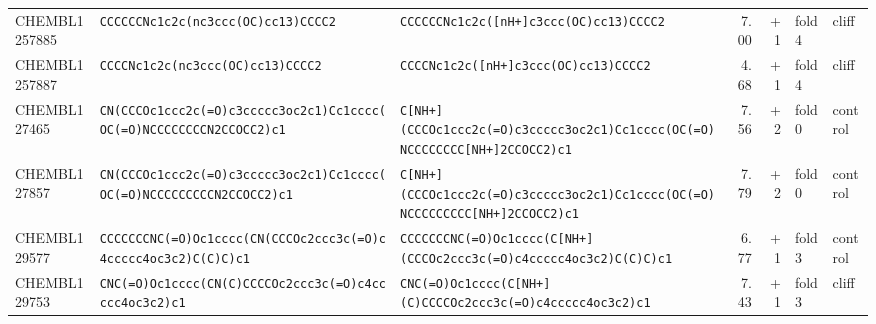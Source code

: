 \begin{longtable}{l p{4.4cm} p{4.4cm} r r l l}
CHEMBL1257885 & \texttt{CCCCCCNc1c2c(\allowbreak{}nc3ccc(\allowbreak{}OC)\allowbreak{}cc13)\allowbreak{}CCCC2} & \texttt{CCCCCCNc1c2c(\allowbreak{}[nH+]\allowbreak{}c3ccc(\allowbreak{}OC)\allowbreak{}cc13)\allowbreak{}CCCC2} & 7.00 & +1 & fold 4 & cliff \\
CHEMBL1257887 & \texttt{CCCCNc1c2c(\allowbreak{}nc3ccc(\allowbreak{}OC)\allowbreak{}cc13)\allowbreak{}CCCC2} & \texttt{CCCCNc1c2c(\allowbreak{}[nH+]\allowbreak{}c3ccc(\allowbreak{}OC)\allowbreak{}cc13)\allowbreak{}CCCC2} & 4.68 & +1 & fold 4 & cliff \\
CHEMBL127465 & \texttt{CN(\allowbreak{}CCCOc1ccc2c(\allowbreak{}=\allowbreak{}O)\allowbreak{}c3ccccc3oc2c1)\allowbreak{}Cc1cccc(\allowbreak{}OC(\allowbreak{}=\allowbreak{}O)\allowbreak{}NCCCCCCCCN2CCOCC2)\allowbreak{}c1} & \texttt{C[NH+]\allowbreak{}(\allowbreak{}CCCOc1ccc2c(\allowbreak{}=\allowbreak{}O)\allowbreak{}c3ccccc3oc2c1)\allowbreak{}Cc1cccc(\allowbreak{}OC(\allowbreak{}=\allowbreak{}O)\allowbreak{}NCCCCCCCC[NH+]\allowbreak{}2CCOCC2)\allowbreak{}c1} & 7.56 & +2 & fold 0 & control \\
CHEMBL127857 & \texttt{CN(\allowbreak{}CCCOc1ccc2c(\allowbreak{}=\allowbreak{}O)\allowbreak{}c3ccccc3oc2c1)\allowbreak{}Cc1cccc(\allowbreak{}OC(\allowbreak{}=\allowbreak{}O)\allowbreak{}NCCCCCCCCCN2CCOCC2)\allowbreak{}c1} & \texttt{C[NH+]\allowbreak{}(\allowbreak{}CCCOc1ccc2c(\allowbreak{}=\allowbreak{}O)\allowbreak{}c3ccccc3oc2c1)\allowbreak{}Cc1cccc(\allowbreak{}OC(\allowbreak{}=\allowbreak{}O)\allowbreak{}NCCCCCCCCC[NH+]\allowbreak{}2CCOCC2)\allowbreak{}c1} & 7.79 & +2 & fold 0 & control \\
CHEMBL129577 & \texttt{CCCCCCCNC(\allowbreak{}=\allowbreak{}O)\allowbreak{}Oc1cccc(\allowbreak{}CN(\allowbreak{}CCCOc2ccc3c(\allowbreak{}=\allowbreak{}O)\allowbreak{}c4ccccc4oc3c2)\allowbreak{}C(\allowbreak{}C)\allowbreak{}C)\allowbreak{}c1} & \texttt{CCCCCCCNC(\allowbreak{}=\allowbreak{}O)\allowbreak{}Oc1cccc(\allowbreak{}C[NH+]\allowbreak{}(\allowbreak{}CCCOc2ccc3c(\allowbreak{}=\allowbreak{}O)\allowbreak{}c4ccccc4oc3c2)\allowbreak{}C(\allowbreak{}C)\allowbreak{}C)\allowbreak{}c1} & 6.77 & +1 & fold 3 & control \\
CHEMBL129753 & \texttt{CNC(\allowbreak{}=\allowbreak{}O)\allowbreak{}Oc1cccc(\allowbreak{}CN(\allowbreak{}C)\allowbreak{}CCCCOc2ccc3c(\allowbreak{}=\allowbreak{}O)\allowbreak{}c4ccccc4oc3c2)\allowbreak{}c1} & \texttt{CNC(\allowbreak{}=\allowbreak{}O)\allowbreak{}Oc1cccc(\allowbreak{}C[NH+]\allowbreak{}(\allowbreak{}C)\allowbreak{}CCCCOc2ccc3c(\allowbreak{}=\allowbreak{}O)\allowbreak{}c4ccccc4oc3c2)\allowbreak{}c1} & 7.43 & +1 & fold 3 & cliff \\

\end{longtable}
